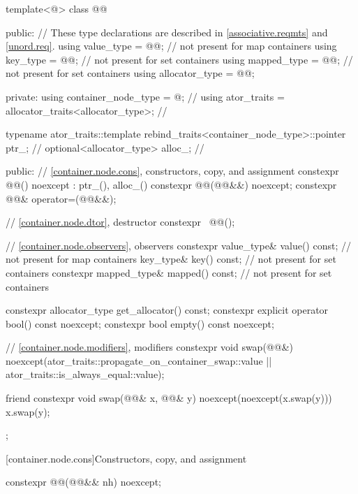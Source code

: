 \begin{codeblock}
template<@\unspecnc@>
class @@ {
public:
  // These type declarations are described in \ref{associative.reqmts} and \ref{unord.req}.
  using value_type     = @\seebelownc{}@;     // not present for map containers
  using key_type       = @\seebelownc{}@;     // not present for set containers
  using mapped_type    = @\seebelownc{}@;     // not present for set containers
  using allocator_type = @\seebelownc{}@;

private:
  using container_node_type = @\unspecnc@;                  // \expos
  using ator_traits = allocator_traits<allocator_type>;     // \expos

  typename ator_traits::template
    rebind_traits<container_node_type>::pointer ptr_;       // \expos
  optional<allocator_type> alloc_;                          // \expos

public:
  // \ref{container.node.cons}, constructors, copy, and assignment
  constexpr @@() noexcept : ptr_(), alloc_() {}
  constexpr @@(@@&&) noexcept;
  constexpr @@& operator=(@@&&);

  // \ref{container.node.dtor}, destructor
  constexpr ~@@();

  // \ref{container.node.observers}, observers
  constexpr value_type& value() const;          // not present for map containers
  key_type& key() const;                        // not present for set containers
  constexpr mapped_type& mapped() const;        // not present for set containers

  constexpr allocator_type get_allocator() const;
  constexpr explicit operator bool() const noexcept;
  constexpr bool empty() const noexcept;

  // \ref{container.node.modifiers}, modifiers
  constexpr void swap(@@&)
    noexcept(ator_traits::propagate_on_container_swap::value ||
             ator_traits::is_always_equal::value);

  friend constexpr void swap(@@& x, @@& y) noexcept(noexcept(x.swap(y))) {
    x.swap(y);
  }
};
\end{codeblock}

[container.node.cons]{Constructors, copy, and assignment}

\begin{itemdecl}
constexpr @@(@@&& nh) noexcept;
\end{itemdecl}

